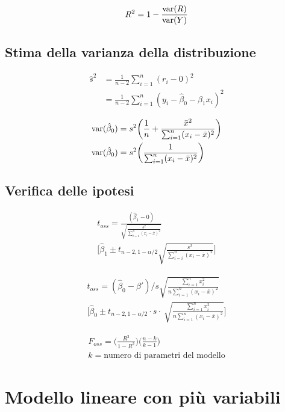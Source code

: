 $$
R^2 = 1 - \frac{\text{var}(R)}{\text{var}(Y)}
$$


\subsection{Stima della varianza della distribuzione}

\begin{align*} 
\hat{s}^2 &= \frac{1}{n-2}\sum\limits_{i=1}^n (r_{i} - 0)^2\\
&= \frac{1}{n-2}\sum\limits_{i=1}^n (y_i - \hat{\beta}_0 - \hat{\beta}_1x_i)^2
\end{align*}

\begin{align*}
	\text{var}(\hat{\beta}_0) &= s^2 \bigg( \frac{1}{n} + \frac{\bar{x}^2}{\sum_{i=1}^{n} (x_i - \bar{x})^2}\bigg) \\
	\text{var}(\hat{\beta}_0) &= s^2 \bigg( \frac{1}{\sum_{i=1}^{n} (x_i - \bar{x})^2} \bigg)
\end{align*}


\subsection{Verifica delle ipotesi}

\begin{align*}
t_{oss} = \frac{(\hat{\beta}_1 - 0)}{\sqrt{\frac{s^2}{\sum_{i=1}^{n} (x_i - \bar{x})^2}}} \\
\Bigg[ \hat{\beta}_1 \pm t_{n-2, 1-\alpha/2}  \sqrt{\frac{s^2}{\sum_{i=i}^{n} (x_i - \bar{x})^2}}\Bigg]
\end{align*}

\begin{align*}
t_{oss}  = (\hat{\beta}_0 - \beta') \Bigg/ s \sqrt{\frac{\sum_{i=1}^{n} x_{i}^2}{n \sum_{i=1}^{n} (x_i - \bar{x})^2}} \\
\Bigg[ \hat{\beta}_0 \pm t_{n-2, 1-\alpha/2} \cdot s \cdot \: \sqrt{\frac{\sum_{i=1}^{n} x_{i}^2}{n \sum_{i=1}^{n} (x_i - \bar{x})^2}} \Bigg]
\end{align*}

\begin{align*}
	F_{oss} = \Bigg( \frac{R^2}{ 1 - R^2}\Bigg) \Bigg( \frac{n -k}{k-1} \Bigg) \\
	k = \text{numero di parametri del modello}
\end{align*}

\section{Modello lineare con più variabili}

